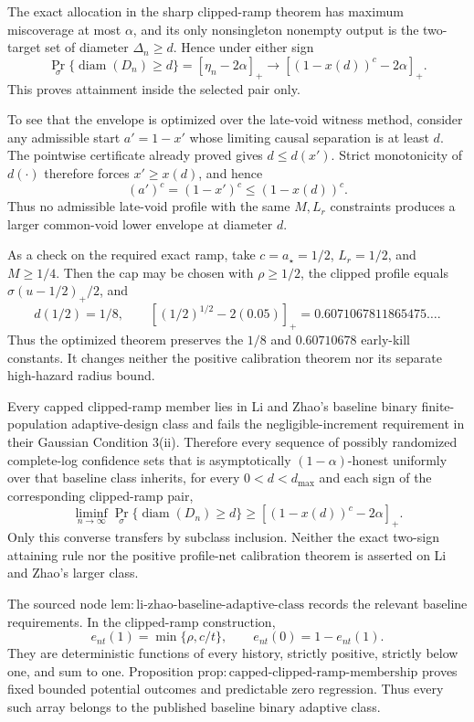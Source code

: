 The exact allocation in the sharp clipped-ramp theorem has maximum miscoverage at most \(\alpha\), and its only nonsingleton nonempty output is the two-target set of diameter \(\Delta_n\ge d\). Hence under either sign
\[
 \Pr_\sigma\{\operatorname{diam}(D_n)\ge d\}
 =[\eta_n-2\alpha]_+
 \longrightarrow[(1-x(d))^c-2\alpha]_+.
\]
This proves attainment inside the selected pair only.

To see that the envelope is optimized over the late-void witness method, consider any admissible start \(a'=1-x'\) whose limiting causal separation is at least \(d\). The pointwise certificate already proved gives \(d\le d(x')\). Strict monotonicity of \(d(\cdot)\) therefore forces \(x'\ge x(d)\), and hence
\[
 (a')^c=(1-x')^c\le(1-x(d))^c.
\]
Thus no admissible late-void profile with the same \(M,L_r\) constraints produces a larger common-void lower envelope at diameter \(d\).

As a check on the required exact ramp, take \(c=a_\star=1/2\), \(L_r=1/2\), and \(M\ge1/4\). Then the cap may be chosen with \(\rho\ge1/2\), the clipped profile equals \(\sigma(u-1/2)_+/2\), and
\[
 d(1/2)=1/8,
 \qquad
 [(1/2)^{1/2}-2(0.05)]_+
 =0.6071067811865475\ldots.
\]
Thus the optimized theorem preserves the \(1/8\) and \(0.60710678\) early-kill constants. It changes neither the positive calibration theorem nor its separate high-hazard radius bound.

Every capped clipped-ramp member lies in Li and Zhao's baseline binary finite-population adaptive-design class and fails the negligible-increment requirement in their Gaussian Condition 3(ii). Therefore every sequence of possibly randomized complete-log confidence sets that is asymptotically \((1-\alpha)\)-honest uniformly over that baseline class inherits, for every \(0<d<d_{\max}\) and each sign of the corresponding clipped-ramp pair,
\[
 \liminf_{n\to\infty}
 \Pr_\sigma\{\operatorname{diam}(D_n)\ge d\}
 \ge[(1-x(d))^c-2\alpha]_+.
\]
Only this converse transfers by subclass inclusion. Neither the exact two-sign attaining rule nor the positive profile-net calibration theorem is asserted on Li and Zhao's larger class.

The sourced node \(\mathrm{lem:li\mbox{-}zhao\mbox{-}baseline\mbox{-}adaptive\mbox{-}class}\) records the relevant baseline requirements. In the clipped-ramp construction,
\[
 e_{nt}(1)=\min\{\rho,c/t\},
 \qquad
 e_{nt}(0)=1-e_{nt}(1).
\]
They are deterministic functions of every history, strictly positive, strictly below one, and sum to one. Proposition \(\mathrm{prop:capped\mbox{-}clipped\mbox{-}ramp\mbox{-}membership}\) proves fixed bounded potential outcomes and predictable zero regression. Thus every such array belongs to the published baseline binary adaptive class.

